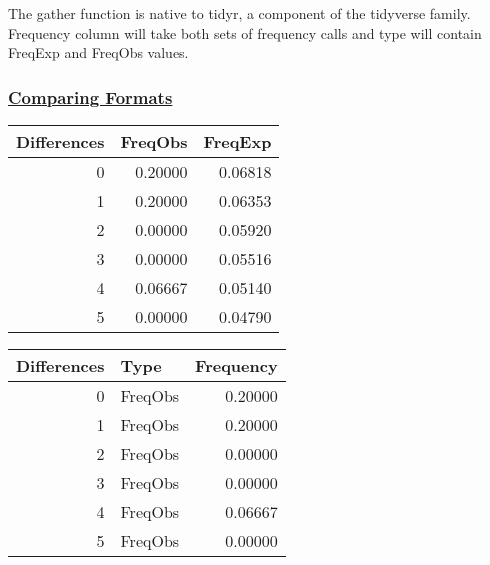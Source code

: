 \documentclass[]{article}
\newenvironment{Shaded}{\begin{snugshade}}{\end{snugshade}}
\newcommand{\KeywordTok}[1]{\textcolor[rgb]{0.13,0.29,0.53}{\textbf{#1}}}
\newcommand{\StringTok}[1]{\textcolor[rgb]{0.31,0.60,0.02}{#1}}
\newcommand{\CommentTok}[1]{\textcolor[rgb]{0.56,0.35,0.01}{\textit{#1}}}
\newcommand{\OperatorTok}[1]{\textcolor[rgb]{0.81,0.36,0.00}{\textbf{#1}}}
\newcommand{\NormalTok}[1]{#1}
\begin{document}
The gather function is native to tidyr, a component of the tidyverse
family. Frequency column will take both sets of frequency calls and type
will contain FreqExp and FreqObs values.

\subsubsection{\texorpdfstring{\href{sheading-2}{Comparing
Formats}}{Comparing Formats}}\label{comparing-formats}

\begin{Shaded}
\end{Shaded}

\begin{longtable}[]{@{}rrr@{}}
\toprule
Differences & FreqObs & FreqExp\tabularnewline
\midrule
\endhead
0 & 0.20000 & 0.06818\tabularnewline
1 & 0.20000 & 0.06353\tabularnewline
2 & 0.00000 & 0.05920\tabularnewline
3 & 0.00000 & 0.05516\tabularnewline
4 & 0.06667 & 0.05140\tabularnewline
5 & 0.00000 & 0.04790\tabularnewline
\bottomrule
\end{longtable}

\begin{Shaded}
\end{Shaded}

\begin{longtable}[]{@{}rlr@{}}
\toprule
Differences & Type & Frequency\tabularnewline
\midrule
\endhead
0 & FreqObs & 0.20000\tabularnewline
1 & FreqObs & 0.20000\tabularnewline
2 & FreqObs & 0.00000\tabularnewline
3 & FreqObs & 0.00000\tabularnewline
4 & FreqObs & 0.06667\tabularnewline
5 & FreqObs & 0.00000\tabularnewline
\bottomrule
\end{longtable}

\begin{Shaded}
\end{Shaded}
\end{document}
